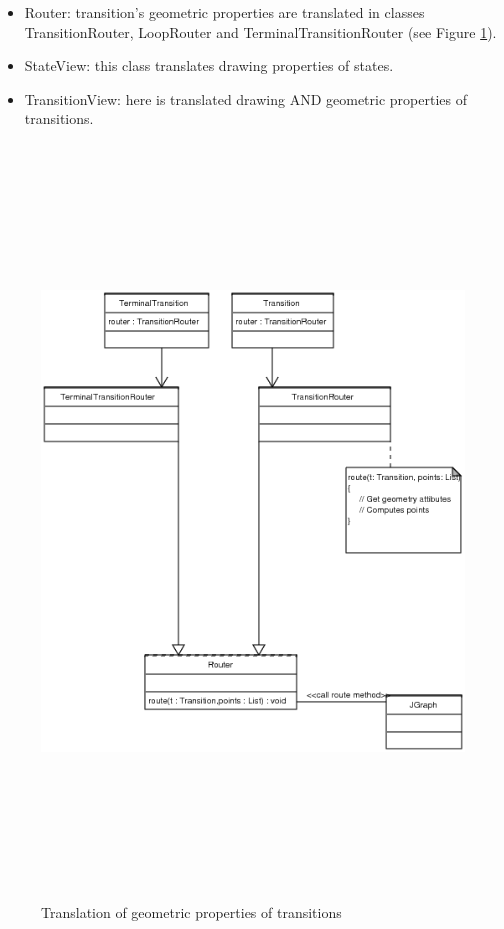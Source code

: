 \begin{itemize}
\item Router: transition's geometric properties are translated in
  classes TransitionRouter, LoopRouter and TerminalTransitionRouter
  (see Figure \ref{diaroute}).
\item StateView: this class translates drawing properties of states.
\item TransitionView: here is translated drawing AND geometric
  properties of transitions.
\end{itemize}

\begin{figure}[h]
  \centering
  \includegraphics[width=16cm, height=20cm]{img/routing.png}
  \caption{Translation of geometric properties of transitions}
  \label{diaroute}
\end{figure}






